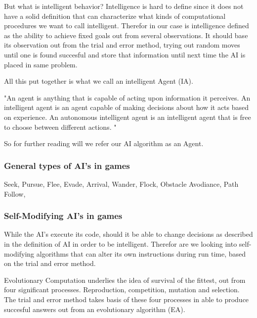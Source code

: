 But what is intelligent behavior? Intelligence is hard to define since it does not have a solid definition that can characterize what kinds of computational procedures we want to call intelligent.
Therefor in our case is intelligence defined as the ability to achieve fixed goals out from several observations.
It should base its observation out from the trial and error method, trying out random moves until one is found succesful and store that information until next time the AI is placed in same problem. 

All this put together is what we call an intelligent Agent (IA).

"An agent is anything that is capable of acting upon information it perceives. An intelligent agent is an agent capable of making decisions about how it acts based on experience. An autonomous intelligent agent is an intelligent agent that is free to choose between different actions. "

So for further reading will we refer our AI algorithm as an Agent.


\subsubsection{General types of AI's in games}

Seek,
Pursue,
Flee,
Evade,
Arrival,
Wander,
Flock,
Obstacle Avodiance,
Path Follow,


\subsubsection{Self-Modifying AI's in games}

While the AI's execute its code, should it be able to change decisions as described in the definition of AI in order to be intelligent. Therefor are we looking into self-modifying algorithms that can alter its own instructions during run time, based on the trial and error method.  

Evolutionary Computation underlies the idea of survival of the fittest, out from four significant processes. 
Reproduction, competition, mutation and selection. \cite{Fogel 1997} The trial and error method takes basis of these four processes in able to produce succesful answers out from an evolutionary algorithm (EA). 

